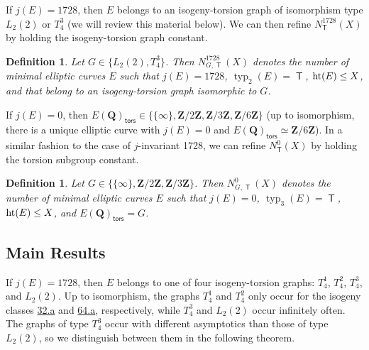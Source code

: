 \documentclass{amsart}
\newcommand{\Z}{\mathbf{Z}}
\newcommand{\Q}{\mathbf{Q}}
\newcommand{\T}{\operatorname{\mathsf{T}}}
\newcommand{\tors}{\mathsf{tors}}
\DeclareMathOperator{\height}{\rm ht}
\DeclareMathOperator{\typ}{{typ}}
\numberwithin{equation}{section}
\theoremstyle{plain}
\newtheorem{defn}[equation]{Definition}
\theoremstyle{remark}
\begin{document}
If $j(E) = 1728$, then $E$ belongs to an isogeny-torsion graph of isomorphism type $L_2(2)$ or $T_4^3$ (we will review this material below).  We can then refine $N_{\T}^{1728}(X)$ by holding the isogeny-torsion graph constant.

\begin{defn}
Let $G \in \lbrace L_2(2), T_4^3 \rbrace$. Then $N_{G,\T}^{1728}(X)$ denotes the number of minimal elliptic curves $E$ such that $j(E) = 1728$, $\typ_2(E) = \T$, $\height(E) \leq X$, and that belong to an isogeny-torsion graph isomorphic to $G$. 
\end{defn}

If $j(E) = 0$, then $E(\Q)_{\tors} \in \lbrace \lbrace \infty \rbrace, \Z/2\Z, \Z/3\Z, \Z/6\Z \rbrace$ (up to isomorphism, there is a unique elliptic curve with $j(E) = 0$ and $E(\Q)_\tors \simeq \Z/6\Z$).  In a similar fashion to the case of $j$-invariant 1728, we can refine $N_{\T}^{0}(X)$ by holding the torsion subgroup constant.

\begin{defn}
Let $G \in  \lbrace \lbrace \infty \rbrace, \Z/2\Z, \Z/3\Z \rbrace$. Then $N_{G,\T}^{0}(X)$ denotes the number of minimal elliptic curves $E$ such that $j(E) = 0$, $\typ_3(E) = \T$, $\height(E) \leq X$, and $E(\Q)_{\tors}  = G$.
\end{defn}

\subsection{Main Results} If $j(E) = 1728$, then $E$ belongs to one of four isogeny-torsion graphs: $T_4^1$, $T_4^2$, $T_4^3$, and $L_2(2)$.  Up to isomorphism, the graphs $T_4^1$ and $T_4^2$ only occur for the isogeny classes \href{https://beta.lmfdb.org/EllipticCurve/Q/32/a/}{32.a} and \href{https://beta.lmfdb.org/EllipticCurve/Q/64/a/}{64.a}, respectively, while $T_4^3$ and $L_2(2)$ occur infinitely often.  The graphs of type $T_4^3$ occur with different asymptotics than those of type $L_2(2)$, so we distinguish between them in the following theorem.
\end{document}
